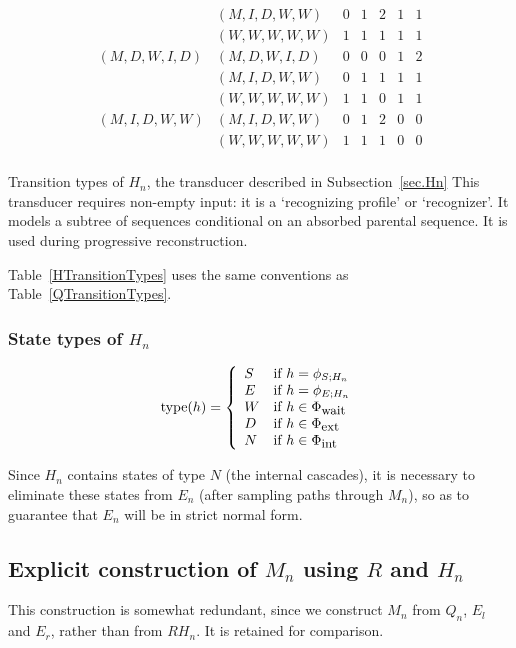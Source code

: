\documentclass{article}
\newcommand{\secref}[1]{Subsection~\ref{sec.#1}}
\newcommand\compose{}
\newcommand\States{\Phi}
\newcommand\statesof[1]{\States_{#1}}
\newcommand\startstateof[1]{\phi_{S;#1}}
\newcommand\laststateof[1]{\phi_{E;#1}}
\newcommand\statetype{\mbox{type}}
\newcommand\stateset[1]{\statesof{\mbox{\small #1}}}
\newcommand\externalsuffix{ext}
\newcommand\internalsuffix{int}
\newcommand\waitsuffix{wait}
\newcommand\externalcascades{\stateset{\externalsuffix}}
\newcommand\internalcascades{\stateset{\internalsuffix}}
\newcommand\waitstates{\stateset{\waitsuffix}}
\begin{document}
\begin{table}
\[\begin{array}{ll|ccccc}
            & (M,I,D,W,W) & 0 & 1 & 2 & 1 & 1 \\
            & (W,W,W,W,W) & 1 & 1 & 1 & 1 & 1 \\
\hline
(M,D,W,I,D) & (M,D,W,I,D) & 0 & 0 & 0 & 1 & 2 \\
            & (M,I,D,W,W) & 0 & 1 & 1 & 1 & 1 \\
            & (W,W,W,W,W) & 1 & 1 & 0 & 1 & 1 \\
\hline
(M,I,D,W,W) & (M,I,D,W,W) & 0 & 1 & 2 & 0 & 0 \\
            & (W,W,W,W,W) & 1 & 1 & 1 & 0 & 0 \\
\end{array}
\]
\caption{
\label{HTransitionTypes}
Transition types of $H_n$, the transducer described in  \secref{Hn}
 This transducer requires non-empty input: it is
 a `recognizing profile' or `recognizer'. It  models a subtree of sequences
 conditional on an absorbed parental sequence. 
It is used during progressive reconstruction.}
\end{table}
Table~\ref{HTransitionTypes} uses the same conventions as Table~\ref{QTransitionTypes}.

\subsubsection{State types of $H_n$}

\[
\statetype(h) = \left\{ \begin{array}{ll}
S & \mbox{if $h = \startstateof{H_n}$} \\
E & \mbox{if $h = \laststateof{H_n}$} \\
W & \mbox{if $h \in \waitstates$} \\
D & \mbox{if $h \in \externalcascades$} \\
N & \mbox{if $h \in \internalcascades$}
\end{array} \right.
\]

Since $H_n$ contains states of type $N$ (the internal cascades),
it is necessary to eliminate these states from $E_n$ (after sampling paths through $M_n$),
so as to guarantee that $E_n$ will be in strict normal form.



\subsection{Explicit construction of $M_n$ using $R$ and $H_n$}

This construction is somewhat redundant, since we construct $M_n$ from $Q_n$, $E_l$ and $E_r$, rather than from $R \compose H_n$.
It is retained for comparison.
\end{document}
